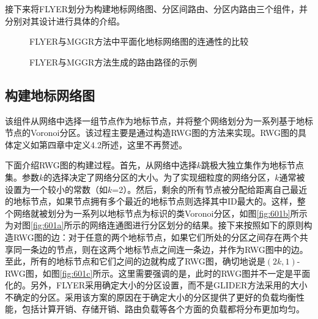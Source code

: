 接下来将FLYER划分为构建地标网络图、分区间路由、分区内路由三个组件，并分别对其设计进行具体的介绍。
\begin{figure}[t]
  \centering
  \hspace{0.25em}
  \hspace{0.25em}
  \caption{FLYER与MGGR方法中平面化地标网络图的连通性的比较}
  \label{fig:603}
\end{figure}

\begin{figure}[h]
  \centering
  \hspace{0.5em}
  \caption{FLYER与MGGR方法生成的路由路径的示例}
  \label{fig:604}
\end{figure}
\subsection{构建地标网络图}
该组件从网络中选择一组节点作为地标节点，并将整个网络划分为一系列基于地标节点的Voronoi分区。该过程主要是通过构造RWG图的方法来实现。RWG图的具体定义如第四章中定义4.2所述，这里不再赘述。

下面介绍RWG图的构建过程。首先，从网络中选择$k$跳极大独立集作为地标节点集。参数$k$的选择决定了网络分区的大小。为了实现细粒度的网络分区，$k$通常被设置为一个较小的常数（如$k$=2）。然后，剩余的所有节点被分配给距离自己最近的地标节点，如果节点拥有多个最近的地标节点则选择其中ID最大的。这样，整个网络就被划分为一系列以地标节点为标识的类Voronoi分区，如图\ref{fig:601b}所示为对图\ref{fig:601a}所示的网络连通图进行分区划分的结果。接下来按照如下的原则构造RWG图的边：对于任意的两个地标节点，如果它们所处的分区之间存在两个共享同一条边的节点，则在这两个地标节点之间连一条边，并作为RWG图中的边。至此，所有的地标节点和它们之间的边就构成了RWG图，确切地说是$(2k,1)$-RWG图，如图\ref{fig:601c}所示。这里需要强调的是，此时的RWG图并不一定是平面化的。另外，FLYER采用确定大小的分区设置，而不是GLIDER方法采用的大小不确定的分区。采用该方案的原因在于确定大小的分区提供了更好的负载均衡性能，包括计算开销、存储开销、路由负载等各个方面的负载都将分布更加均匀。

